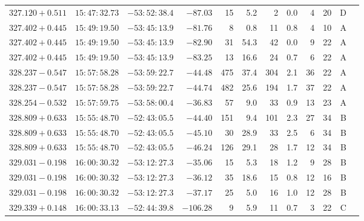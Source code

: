 {\begin{longtable}{c rrr rrrrr rr c}
    $327.120+0.511$     &   $15:47:32.73$     &   $-53:52:38.4$     &   $-87.03  $    &   15     &    5.2    &    2   &   0.0 &   4   &   20  &   D   \\
    $327.402+0.445$     &   $15:49:19.50$     &   $-53:45:13.9$     &   $-81.76  $    &   8      &    0.8    &    11  &   0.8 &   4   &   10  &   A   \\
    $327.402+0.445$     &   $15:49:19.50$     &   $-53:45:13.9$     &   $-82.90  $    &   31     &   54.3    &    42  &   0.0 &   9   &   22  &   A   \\
    $327.402+0.445$     &   $15:49:19.50$     &   $-53:45:13.9$     &   $-83.25  $    &   13     &   16.6    &    24  &   0.7 &   6   &   22  &   A   \\
    $328.237-0.547$     &   $15:57:58.28$     &   $-53:59:22.7$     &   $-44.48  $    &   475    &   37.4    &    304 &   2.1 &   36  &   22  &   A   \\
    $328.237-0.547$     &   $15:57:58.28$     &   $-53:59:22.7$     &   $-44.74  $    &   482    &   25.6    &    194 &   1.7 &   37  &   22  &   A   \\
    $328.254-0.532$     &   $15:57:59.75$     &   $-53:58:00.4$     &   $-36.83  $    &   57     &    9.0    &    33  &   0.9 &   13  &   23  &   A   \\
    $328.809+0.633$     &   $15:55:48.70$     &   $-52:43:05.5$     &   $-44.40  $    &   151    &    9.4    &    101 &   2.3 &   27  &   34  &   B   \\
    $328.809+0.633$     &   $15:55:48.70$     &   $-52:43:05.5$     &   $-45.10  $    &   30     &   28.9    &    33  &   2.5 &   6   &   34  &   B   \\
    $328.809+0.633$     &   $15:55:48.70$     &   $-52:43:05.5$     &   $-46.24  $    &   126    &   29.1    &    28  &   1.7 &   12  &   34  &   B   \\
    $329.031-0.198$     &   $16:00:30.32$     &   $-53:12:27.3$     &   $-35.06  $    &   15     &    5.3    &    18  &   1.2 &   9   &   28  &   B   \\
    $329.031-0.198$     &   $16:00:30.32$     &   $-53:12:27.3$     &   $-36.12  $    &   35     &   18.6    &    15  &   0.8 &   12  &   16  &   B   \\
    $329.031-0.198$     &   $16:00:30.32$     &   $-53:12:27.3$     &   $-37.17  $    &   25     &    5.0    &    16  &   1.0 &   12  &   28  &   B   \\
    $329.339+0.148$     &   $16:00:33.13$     &   $-52:44:39.8$     &   $-106.28 $    &   9      &    5.9    &    11  &   0.7 &   3   &   22  &   C   \\

\end{longtable}}
